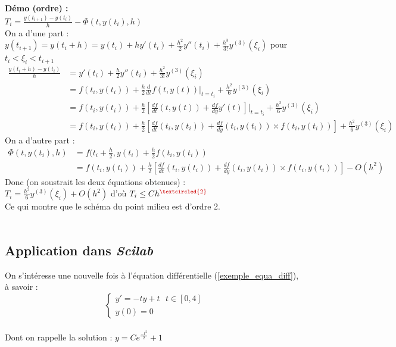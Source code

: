 \documentclass[a4paper,10pt]{report}
\begin{document}
\textbf{Démo (ordre) :}\\
\indent $T_i =\frac{y(t_{i+1})-y(t_i)}{h}-\Phi(t,y(t_i),h)$\\
\indent On a d'une part :\\
\indent $y(t_{i+1})=y(t_i+h)=y(t_i)+hy'(t_i)+\frac{h^2}{2}y''(t_i)+\frac{h^3}{3!}y^{(3)}(\xi_i)$ pour $t_i<\xi_i<t_{i+1}$
\begin{align*}
\frac{y(t_i+h)-y(t_i)}{h} & = y'(t_i)+\frac{h}{2}y''(t_i)+\frac{h^2}{3!}y^{(3)}(\xi_i) \\
						  & = f(t_i,y(t_i))+\frac{h}{2} \frac{d}{dt}f(t,y(t))|_{t=t_i} + \frac{h^2}{6}y^{(3)}(\xi_i) \\
						  & = f(t_i,y(t_i))+\frac{h}{2}\left[\frac{df}{dt}(t,y(t))+\frac{df}{dy}y'(t)\right]|_{t=t_i} + \frac{h^2}{6}y^{(3)}(\xi_i) \\
						  & = f(t_i,y(t_i))+\frac{h}{2}\left[\frac{df}{dt}(t_i,y(t_i))+\frac{df}{dy}(t_i,y(t_i))\times f(t_i,y(t_i))\right] + \frac{h^2}{6}y^{(3)}(\xi_i)
\end{align*}
\indent On a d'autre part :\\
\begin{align*}
\Phi(t,y(t_i),h) & = f(t_i+\frac{h}{2}, y(t_i)+\frac{h}{2}f(t_i,y(t_i)) \\
				 & = f(t_i,y(t_i))+\frac{h}{2}\left[\frac{df}{dt}(t_i,y(t_i))+\frac{df}{dy}(t_i,y(t_i))\times f(t_i,y(t_i))\right] -O(h^2)
\end{align*}
\indent Donc (on soustrait les deux équations obtenues) :\\
\indent $T_i=\frac{h^2}{6}y^{(3)}(\xi_i) + O(h^2)$ d'où $T_i \leq Ch^{\textcolor{red}{\textcircled{\scriptsize 2}}}$ \\
\indent Ce qui montre que le schéma du point milieu est d'ordre 2.\\ \\

\subsection{Application dans \textit{Scilab}}
On s'intéresse une nouvelle fois à l'équation différentielle (\ref{exemple_equa_diff}), à savoir :\\
\begin{equation*}
\left\lbrace
\begin{array}{l}
y'=-ty+t \ \ \ t \in [0,4] \\
y(0)=0
\end{array}\right.
\end{equation*} \\
Dont on rappelle la solution : $y=Ce^{\frac{-t^2}{2}}+1$\\ \\
\end{document}
